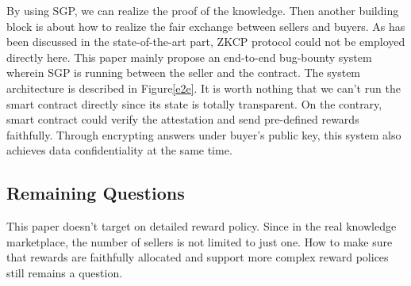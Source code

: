 \documentclass[conference]{IEEEtran}
\begin{document}
By using SGP, we can realize the proof of the knowledge.
%
Then another building block is about how to realize the fair exchange between sellers and buyers.
%
As has been discussed in the state-of-the-art part, ZKCP protocol could not be employed directly here.
%
This paper mainly propose an end-to-end bug-bounty system wherein SGP is running between the seller and the contract.
%
The system architecture is described in Figure\ref{e2e}.
%
It is worth nothing that we can't run the smart contract directly since its state is totally transparent.
%
On the contrary, smart contract could verify the attestation and send pre-defined rewards faithfully.
%
Through encrypting answers under buyer's public key, this system also achieves data confidentiality at the same time.

\subsection{Remaining Questions}
This paper doesn't target on detailed reward policy.
%
Since in the real knowledge marketplace, the number of sellers is not limited to just one.
%
How to make sure that rewards are faithfully allocated and support more complex reward polices still remains a question. 



\end{document}
